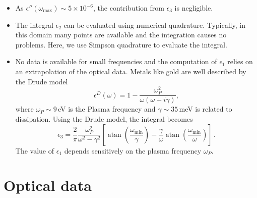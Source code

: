 \documentclass[twocolumn,superscriptaddress,pre]{revtex4-1}
\DeclareMathOperator{\atan}{atan}
\begin{document}
\begin{itemize}
\item As $\epsilon''(\omega_\mathrm{max}) \sim 5\times10^{-6}$, the contribution
from $\epsilon_3$ is negligible.
\item The integral $\epsilon_2$ can be evaluated using numerical quadrature.
Typically, in this domain many points are available and the integration causes
no problems. Here, we use Simpson quadrature to evaluate the integral.
\item No data is available for small frequencies and the computation of
$\epsilon_1$ relies on an extrapolation of the optical data. Metals like
gold are well described by the Drude model
\begin{equation}
\label{eq:drude}
\epsilon^D(\omega) = 1 - \frac{\omega_P^2}{\omega(\omega+i\gamma)},
\end{equation}
where $\omega_P \sim 9\,$eV is the Plasma frequency and $\gamma \sim 35\,$meV
is related to dissipation. Using the Drude model, the integral becomes
\begin{equation}
\epsilon_3 = \frac{2}{\pi} \frac{\omega_P^2}{\omega^2-\gamma^2} \left[ \atan\left(\frac{\omega_\mathrm{min}}{\gamma}\right) - \frac{\gamma}{\omega} \atan\left(\frac{\omega_\mathrm{min}}{\omega}\right)\right] \,.
\end{equation}
The value of $\epsilon_1$ depends sensitively on the plasma frequency
$\omega_P$.
\end{itemize}

\section{Optical data}
\end{document}
